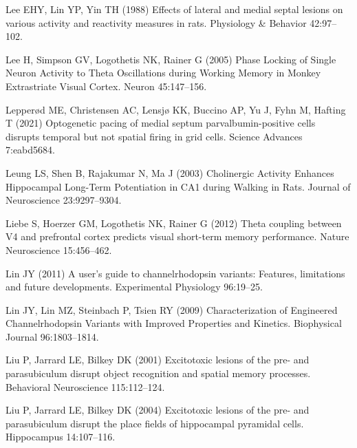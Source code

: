 \documentclass[
  12pt,
  a4paper,
  openany]{book}
\newlength{\cslhangindent}
\newlength{\cslentryspacingunit} %
\newenvironment{CSLReferences}[2] %
 {%
  \setlength{\parindent}{0pt}
  \ifodd #1
  \let\oldpar\par
  \def\par{\hangindent=\cslhangindent\oldpar}
  \fi
  \setlength{\parskip}{#2\cslentryspacingunit}
 }%
 {}
\begin{document}
\begin{CSLReferences}{1}{0}
\leavevmode{}%
Lee EHY, Lin YP, Yin TH (1988) Effects of lateral and medial septal lesions on various activity and reactivity measures in rats. Physiology \& Behavior 42:97--102.

\leavevmode{}%
Lee H, Simpson GV, Logothetis NK, Rainer G (2005) Phase {Locking} of {Single} {Neuron} {Activity} to {Theta} {Oscillations} during {Working} {Memory} in {Monkey} {Extrastriate} {Visual} {Cortex}. Neuron 45:147--156.

\leavevmode{}%
Lepperød ME, Christensen AC, Lensjø KK, Buccino AP, Yu J, Fyhn M, Hafting T (2021) Optogenetic pacing of medial septum parvalbumin-positive cells disrupts temporal but not spatial firing in grid cells. Science Advances 7:eabd5684.

\leavevmode{}%
Leung LS, Shen B, Rajakumar N, Ma J (2003) Cholinergic {Activity} {Enhances} {Hippocampal} {Long}-{Term} {Potentiation} in {CA1} during {Walking} in {Rats}. Journal of Neuroscience 23:9297--9304.

\leavevmode{}%
Liebe S, Hoerzer GM, Logothetis NK, Rainer G (2012) Theta coupling between {V4} and prefrontal cortex predicts visual short-term memory performance. Nature Neuroscience 15:456--462.

\leavevmode{}%
Lin JY (2011) A user's guide to channelrhodopsin variants: Features, limitations and future developments. Experimental Physiology 96:19--25.

\leavevmode{}%
Lin JY, Lin MZ, Steinbach P, Tsien RY (2009) Characterization of {Engineered} {Channelrhodopsin} {Variants} with {Improved} {Properties} and {Kinetics}. Biophysical Journal 96:1803--1814.

\leavevmode{}%
Liu P, Jarrard LE, Bilkey DK (2001) Excitotoxic lesions of the pre- and parasubiculum disrupt object recognition and spatial memory processes. Behavioral Neuroscience 115:112--124.

\leavevmode{}%
Liu P, Jarrard LE, Bilkey DK (2004) Excitotoxic lesions of the pre- and parasubiculum disrupt the place fields of hippocampal pyramidal cells. Hippocampus 14:107--116.


\end{CSLReferences}
\end{document}
